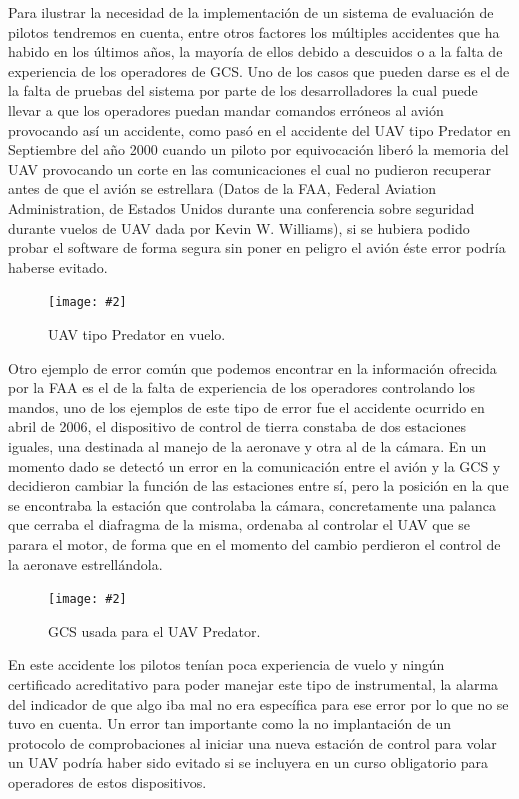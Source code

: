 \documentclass[12pt,a4paper,spanish]{book} %
\newcommand{\imgCentrada}[3]{
\begin{figure}[H]
\begin{center}
\texttt{[image: \#2]}
\caption{#3}
\label{#1}
\end{center}
\end{figure}
}
\begin{document}
Para ilustrar la necesidad de la implementación de un sistema de evaluación de pilotos tendremos en cuenta, entre otros factores los múltiples accidentes que ha habido en los últimos años, la mayoría de ellos debido a descuidos o a la falta de experiencia de los operadores de GCS. Uno de los casos que pueden darse es el de la falta de pruebas del sistema por parte de los desarrolladores la cual puede llevar a que los operadores puedan mandar comandos erróneos al avión provocando así un accidente, como pasó en el accidente del UAV tipo Predator en Septiembre del año 2000 cuando un piloto por equivocación liberó la memoria del UAV provocando un corte en las comunicaciones el cual no pudieron recuperar antes de que el avión se estrellara (Datos de la FAA, Federal Aviation Administration, de Estados Unidos durante una conferencia sobre seguridad durante vuelos de UAV dada por Kevin W. Williams), si se hubiera podido probar el software de forma segura sin poner en peligro el avión éste error podría haberse evitado.

\imgCentrada{fig.1.2}{img/predator.eps}{UAV tipo Predator en vuelo.}

Otro ejemplo de error común que podemos encontrar en la información ofrecida por la FAA es el de la falta de experiencia de los operadores controlando los mandos, uno de los ejemplos de este tipo de error fue el accidente ocurrido en abril de 2006, el dispositivo de control de tierra constaba de dos estaciones iguales, una destinada al manejo de la aeronave y otra al de la cámara. En un momento dado se detectó un error en la comunicación entre el avión y la GCS y decidieron cambiar la función de las estaciones entre sí, pero la posición en la que se encontraba la estación que controlaba la cámara, concretamente una palanca que cerraba el diafragma de la misma, ordenaba al controlar el UAV que se parara el motor, de forma que en el momento del cambio perdieron el control de la aeronave estrellándola. 

\imgCentrada{fig.1.3}{img/predatorgcs.eps}{GCS usada para el UAV Predator.}

En este accidente los pilotos tenían poca experiencia de vuelo y ningún certificado acreditativo para poder manejar este tipo de instrumental, la alarma del indicador de que algo iba mal no era específica para ese error por lo que no se tuvo en cuenta. Un error tan importante como la no implantación de un protocolo de comprobaciones al iniciar una nueva estación de control para volar un UAV podría haber sido evitado si se incluyera en un curso obligatorio para operadores de estos dispositivos.
\end{document}
